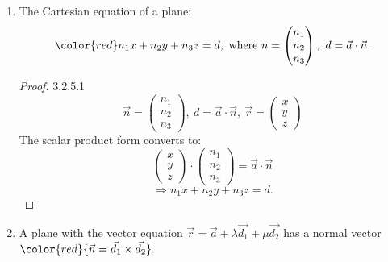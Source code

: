 \documentclass[12pt, a4paper]{article}
\begin{document}
\begin{enumerate}
\begin{itemize}
    \begin{theorem}{3.2.5.1}{}
      $$\color{red} \overrightarrow{AR}\cdot\vec{n}=0\ \Rightarrow\ \left(\vec{r}-\vec{a}\right)\cdot\vec{n}=0$$
      $$\color{red} \therefore \vec{r}\cdot\vec{n}=\vec{a}\cdot\vec{n}$$
      where $\vec{a}$ is the position vector, and $\vec{n}$ is the normal vector. 
    \end{theorem}
  \end{itemize}
  \item The Cartesian equation of a plane: 
  $${\color{red}n_1x+n_2y+n_3z=d},\ \text{where }n=\begin{pmatrix}n_1\\n_2\\n_3\end{pmatrix},\ d=\vec{a}\cdot\vec{n}.$$
  \begin{proof}{3.2.5.1}{}
    $$\vec{n}=\begin{pmatrix}n_1\\n_2\\n_3\end{pmatrix},\ d=\vec{a}\cdot\vec{n},\ \vec{r}=\begin{pmatrix}x\\y\\z\end{pmatrix}$$
    The scalar product form converts to: 
    $$\begin{pmatrix}x\\y\\z\end{pmatrix}\cdot\begin{pmatrix}n_1\\n_2\\n_3\end{pmatrix}=\vec{a}\cdot\vec{n}$$
    $$\Rightarrow n_1x+n_2y+n_3z=d.$$
  \end{proof}
  \item A plane with the vector equation $\vec{r}=\vec{a}+\lambda\vec{d_1}+\mu\vec{d_2}$ has a normal vector ${\color{red}{\vec{n}=\vec{d_1}\times\vec{d_2}}}.$
\end{enumerate}
\end{document}
